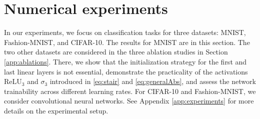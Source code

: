 \documentclass{article}
\theoremstyle{plain}
\theoremstyle{definition}
\theoremstyle{definition}
\theoremstyle{remark}
\theoremstyle{definition}
\theoremstyle{definition}
\theoremstyle{remark}
\numberwithin{equation}{section}
\begin{document}
\begin{table}[ht!]
  \centering
  \caption{\textbf{Sensitivity to network depth $L$ for feedforward models.} MNIST results for feedforward models (numbers indicate percentages). The parameter $\alpha$ represents the negative slope in the activation $\mathrm{LeakyReLU}_{\alpha}$, i.e., $\alpha=0$ coincides with $\mathrm{ReLU}$. The numbers after $\pm$ represent the maximum absolute discrepancy from the mean across the five seeds.}
  \label{tab:ffMNIST}
  \vspace{10pt}
\end{table}

\section{Numerical experiments}\label{se:experiments}
In our experiments, we focus on classification tasks for three datasets: MNIST, Fashion-MNIST, and CIFAR-10. The results for MNIST are in this section. The two other datasets are considered in the three ablation studies in Section \ref{app:ablations}. There, we show that the initialization strategy for the first and last linear layers is not essential, demonstrate the practicality of the activations $\mathrm{ReLU}_3$ and $\sigma_3$ introduced in \eqref{eq:stair} and \eqref{eq:generalAbs}, and assess the network trainability across different learning rates. For CIFAR-10 and Fashion-MNIST, we consider convolutional neural networks. See Appendix \ref{app:experiments} for more details on the experimental setup.
\end{document}

